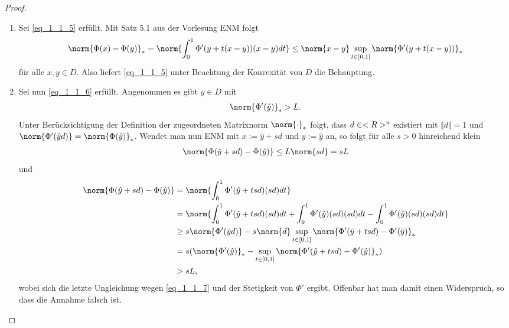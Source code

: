 \begin{proof}
	\begin{enumerate}
		\item Sei \ref{eq_1_1_5} erfüllt. Mit Satz 5.1 aus der Vorlesung ENM folgt %
		\begin{align}
		\norm{\Phi(x) - \Phi(y)}_{\ast} = \norm{\int_{0}^{1} \Phi'(y + t(x-y))(x-y) dt} \le  \norm{x-y} \sup_{t \in [0,1]} \norm{\Phi'(y+t(x-y))}_{\ast}
		\end{align}
		für alle $x,y \in D$. Also liefert \ref{eq_1_1_5} unter Beachtung der Konvexität von $D$ die Behauptung.
		\item Sei nun \ref{eq_1_1_6} erfüllt. Angenommen es gibt $\hat{y} \in D$ mit
		\begin{align}
		\norm{\Phi'(\hat{y})}_{\ast} > L. \label{eq_1_1_7}
		\end{align}
		Unter Berücksichtigung der Definition der zugeordneten Matrixnorm $\norm{\cdot}_{\ast}$ folgt, dass $d \in <R>^n$ existiert mit $\Vert d \Vert = 1$ und $\norm{\Phi'(\hat{y}d)} = \norm{\Phi(\hat{y})}_{\ast}$. Wendet man nun ENM mit $x := \hat{y} + sd$ und $y := \hat{y}$ an, so folgt für alle $s > 0$ hinreichend klein
		\begin{align}
		\norm{\Phi(\hat{y} + sd) - \Phi(\hat{y})} \le L \norm{sd} = sL
		\end{align}
		und 
		\begin{align}
		\norm{\Phi(\hat{y} + sd) - \Phi(\hat{y})} &= \norm{\int_{0}^{1} \Phi'(\hat{y} + tsd)(sd)dt}\notag \\
		&= \norm{\int_{0}^{1} \Phi'(\hat{y} + tsd)(sd)dt + \int_{0}^{1} \Phi'(\hat{y})(sd)(sd)dt - \int_{0}^{1} \Phi'(\hat{y})(sd)(sd)dt}\notag \\
		&\ge s\norm{\Phi'(\hat{y}d)} - s\norm{d} \sup_{t \in [0,1]}\norm{\Phi'(\hat{y} + tsd) - \Phi'(\hat{y})}_{\ast} \notag \\
		&= s (\norm{\Phi'(\hat{y})}_{\ast} - \sup_{t \in [0,1]}\norm{\Phi'(\hat{y} + tsd) - \Phi'(\hat{y})}_{\ast}) \notag\\
		&> sL, \notag
		\end{align}
		wobei sich die letzte Ungleichung wegen \ref{eq_1_1_7} und der Stetigkeit von $\Phi'$ ergibt. Offenbar hat man damit einen Widerspruch, so dass die Annahme falsch ist.
	\end{enumerate}
\end{proof}

